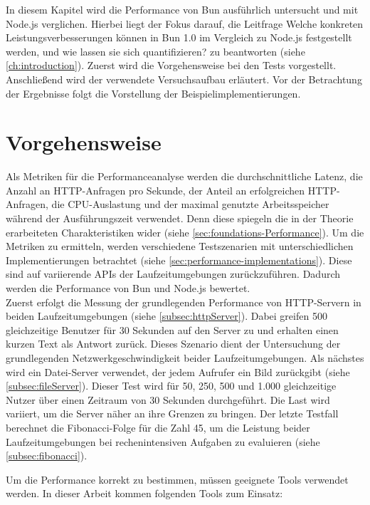  \label{ch:performanceAnalysis}
In diesem Kapitel wird die Performance von Bun ausführlich untersucht und mit Node.js verglichen. Hierbei liegt der Fokus darauf, die Leitfrage \glqq Welche konkreten Leistungsverbesserungen können in Bun 1.0 im Vergleich zu Node.js festgestellt werden, und wie lassen sie sich quantifizieren?\grqq{} zu beantworten (siehe \autoref{ch:introduction}). Zuerst wird die Vorgehensweise bei den Tests vorgestellt. Anschließend wird der verwendete Versuchsaufbau erläutert. Vor der Betrachtung der Ergebnisse folgt die Vorstellung der Beispielimplementierungen.


\section{Vorgehensweise} \label{sec:performance-approach}
Als Metriken für die Performanceanalyse werden die durchschnittliche Latenz, die Anzahl an HTTP-Anfragen pro Sekunde, der Anteil an erfolgreichen HTTP-Anfragen, die CPU-Auslastung und der maximal genutzte Arbeitsspeicher während der Ausführungszeit verwendet. Denn diese spiegeln die in der Theorie erarbeiteten Charakteristiken wider (siehe \autoref{sec:foundations-Performance}). Um die Metriken zu ermitteln, werden verschiedene Testszenarien mit unterschiedlichen Implementierungen betrachtet (siehe \autoref{sec:performance-implementations}). Diese sind auf variierende APIs der Laufzeitumgebungen zurückzuführen. Dadurch werden die Performance von Bun und Node.js bewertet.\\

\noindent
Zuerst erfolgt die Messung der grundlegenden Performance von HTTP-Servern in beiden Laufzeitumgebungen (siehe \autoref{subsec:httpServer}). Dabei greifen 500 gleichzeitige Benutzer für 30 Sekunden auf den Server zu und erhalten einen kurzen Text als Antwort zurück. Dieses Szenario dient der Untersuchung der grundlegenden Netzwerkgeschwindigkeit beider Laufzeitumgebungen. Als nächstes wird ein Datei-Server verwendet, der jedem Aufrufer ein Bild zurückgibt (siehe \autoref{subsec:fileServer}). Dieser Test wird für 50, 250, 500 und 1.000 gleichzeitige Nutzer über einen Zeitraum von 30 Sekunden durchgeführt. Die Last wird variiert, um die Server näher an ihre Grenzen zu bringen. Der letzte Testfall berechnet die Fibonacci-Folge für die Zahl 45, um die Leistung beider Laufzeitumgebungen bei rechenintensiven Aufgaben zu evaluieren (siehe \autoref{subsec:fibonacci}).

\noindent
Um die Performance korrekt zu bestimmen, müssen geeignete Tools verwendet werden. In dieser Arbeit kommen folgenden Tools zum Einsatz:


